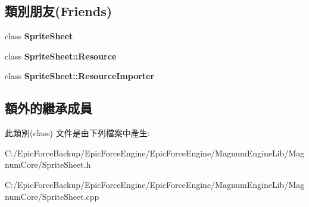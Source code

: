 \subsection*{類別朋友(Friends)}
\begin{DoxyCompactItemize}
\item 
class {\bfseries Sprite\+Sheet}\hypertarget{class_magnum_1_1_sprite_sheet_1_1_resource_importer_ab43118917ba092ba6289c7ee4cd3e5fd}{}\label{class_magnum_1_1_sprite_sheet_1_1_resource_importer_ab43118917ba092ba6289c7ee4cd3e5fd}

\item 
class {\bfseries Sprite\+Sheet\+::\+Resource}\hypertarget{class_magnum_1_1_sprite_sheet_1_1_resource_importer_a8727041c910f9527ea7b20dfac74f485}{}\label{class_magnum_1_1_sprite_sheet_1_1_resource_importer_a8727041c910f9527ea7b20dfac74f485}

\item 
class {\bfseries Sprite\+Sheet\+::\+Resource\+Importer}\hypertarget{class_magnum_1_1_sprite_sheet_1_1_resource_importer_a3c6baee866d2819736b4c0a94c9e507c}{}\label{class_magnum_1_1_sprite_sheet_1_1_resource_importer_a3c6baee866d2819736b4c0a94c9e507c}

\end{DoxyCompactItemize}
\subsection*{額外的繼承成員}


此類別(class) 文件是由下列檔案中產生\+:\begin{DoxyCompactItemize}
\item 
C\+:/\+Epic\+Force\+Backup/\+Epic\+Force\+Engine/\+Epic\+Force\+Engine/\+Magnum\+Engine\+Lib/\+Magnum\+Core/Sprite\+Sheet.\+h\item 
C\+:/\+Epic\+Force\+Backup/\+Epic\+Force\+Engine/\+Epic\+Force\+Engine/\+Magnum\+Engine\+Lib/\+Magnum\+Core/Sprite\+Sheet.\+cpp\end{DoxyCompactItemize}
